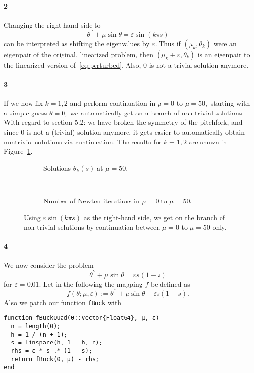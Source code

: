 \documentclass[a4paper]{article}
\begin{document}
  \paragraph{2} Changing the right-hand side to
  \begin{equation}\label{eq:perturbed}
    \theta^{\prime\prime} + \mu \sin \theta = \varepsilon \sin(k\pi s)
  \end{equation}
  can be interpreted as shifting the eigenvalues by $\varepsilon$. Thus if $(\mu_k, \theta_k)$ were an eigenpair of the original, linearized problem, then $(\mu_k + \varepsilon, \theta_k)$ is an eigenpair to the linearized version of~\eqref{eq:perturbed}. Also, $0$ is not a trivial solution anymore.

  \paragraph{3} If we now fix $k = 1, 2$ and perform continuation in $\mu = 0$ to $\mu = 50,$ starting with a simple guess $\theta = 0,$ we automatically get on a branch of non-trivial solutions. With regard to section 5.2: we have broken the symmetry of the pitchfork, and since $0$ is not a (trivial) solution anymore, it gets easier to automatically obtain nontrivial solutions via continuation. The results for $k = 1, 2$ are shown in Figure~\ref{fig:ex4.3}.

  \begin{figure}[h]
    \begin{subfigure}[t]{0.5\textwidth}
      
      \caption{Solutions $\theta_k(s)$ at $\mu = 50.$}
    \end{subfigure}~
    \begin{subfigure}[t]{0.5\textwidth}
      
      \caption{Number of Newton iterations in $\mu = 0$ to $\mu = 50.$}
    \end{subfigure}
    \caption{Using $\varepsilon \sin(k \pi s)$ as the right-hand side, we get on the branch of non-trivial solutions by continuation between $\mu = 0$ to $\mu = 50$ only.}
    \label{fig:ex4.3}
  \end{figure}

  \newpage
  \paragraph{4} We now consider the problem
  \begin{equation}
    \theta^{\prime\prime} + \mu \sin \theta = \varepsilon s(1 - s)
  \end{equation}
  for $\varepsilon = 0.01.$ Let in the following the mapping $f$ be defined as $$f(\theta; \mu, \varepsilon) := \theta^{\prime\prime} + \mu \sin \theta - \varepsilon s(1-s).$$ Also we patch our function {\tt fBuck} with
\begin{verbatim}
function fBuckQuad(θ::Vector{Float64}, μ, ɛ)
  n = length(θ);
  h = 1 / (n + 1);
  s = linspace(h, 1 - h, n);
  rhs = ɛ * s .* (1 - s);
  return fBuck(θ, μ) - rhs;
end  
\end{verbatim}
\end{document}

